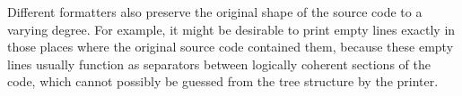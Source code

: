 \bigbreak{}
Different formatters also preserve the original shape of the source code to a varying degree.
For example, it might be desirable to print empty lines
exactly in those places where the original source code contained them,
\autocite[Section: Empty lines]{prettierRationale}
because these empty lines usually function as separators between logically coherent sections of the code,
which cannot possibly be guessed from the tree structure by the printer.
